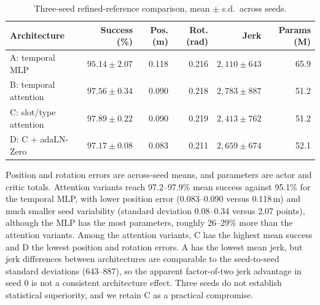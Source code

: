 \begin{table}[t]
\centering\small
\caption{Three-seed refined-reference comparison, mean $\pm$ s.d.\ across seeds.}\label{tab:architecture_seeds}
\begin{tabularx}{\linewidth}{@{}Yrrrrr@{}}
\toprule
Architecture & Success (\%) & Pos. (m) & Rot. (rad) & Jerk & Params (M) \\
\midrule
A: temporal MLP & $95.14\pm2.07$ & 0.118 & 0.216 & $2{,}110\pm643$ & 65.9 \\
B: temporal attention & $97.56\pm0.34$ & 0.090 & 0.218 & $2{,}783\pm887$ & 51.2 \\
C: slot/type attention & $97.89\pm0.22$ & 0.090 & 0.219 & $2{,}413\pm762$ & 51.2 \\
D: C + adaLN-Zero & $97.17\pm0.08$ & 0.083 & 0.211 & $2{,}659\pm674$ & 52.1 \\
\bottomrule
\end{tabularx}
\end{table}

Position and rotation errors are across-seed means, and parameters are actor
and critic totals. Attention variants reach 97.2--97.9\% mean success against
95.1\% for the temporal MLP, with lower position error (0.083--0.090 versus
0.118\,m) and much smaller seed variability (standard deviation 0.08--0.34
versus 2.07 points), although the MLP has the most parameters, roughly
26--29\% more than the attention variants. Among the attention variants, C has
the highest mean success and D the lowest position and rotation errors. A has
the lowest mean jerk, but jerk differences between architectures are
comparable to the seed-to-seed standard deviations (643--887), so the apparent
factor-of-two jerk advantage in seed 0 is not a consistent architecture
effect. Three seeds do not establish statistical superiority, and we retain C as
a practical compromise.

